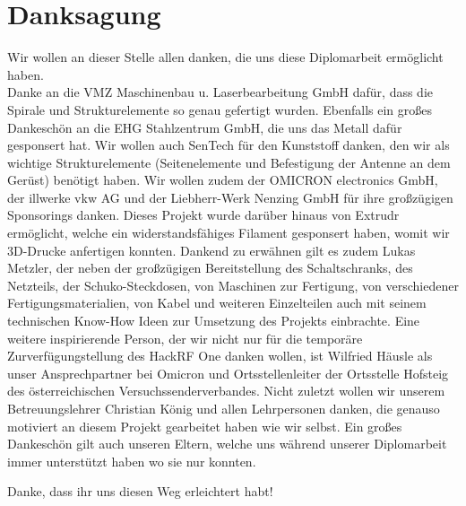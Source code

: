\chapter*{Danksagung}
\label{chap:Danksagung}
Wir wollen an dieser Stelle allen danken, die uns diese Diplomarbeit ermöglicht haben.\\ Danke an die VMZ Maschinenbau u. Laserbearbeitung GmbH dafür, dass die Spirale und Strukturelemente so genau gefertigt wurden. Ebenfalls ein großes Dankeschön an die EHG Stahlzentrum GmbH, die uns das Metall dafür gesponsert hat. Wir wollen auch SenTech für den Kunststoff danken, den wir als wichtige Strukturelemente (Seitenelemente und Befestigung der Antenne an dem Gerüst) benötigt haben. Wir wollen zudem der OMICRON electronics GmbH, der illwerke vkw AG und der Liebherr-Werk Nenzing GmbH für ihre großzügigen Sponsorings danken. Dieses Projekt wurde darüber hinaus von Extrudr ermöglicht, welche ein widerstandsfähiges Filament gesponsert haben, womit wir 3D-Drucke anfertigen konnten. Dankend zu erwähnen gilt es zudem Lukas Metzler, der neben der großzügigen Bereitstellung des Schaltschranks, des Netzteils, der Schuko-Steckdosen, von Maschinen zur Fertigung, von verschiedener Fertigungsmaterialien, von Kabel und weiteren Einzelteilen auch mit seinem technischen Know-How Ideen zur Umsetzung des Projekts einbrachte. Eine weitere inspirierende Person, der wir nicht nur für die temporäre Zurverfügungstellung des HackRF One danken wollen, ist Wilfried Häusle als unser Ansprechpartner bei Omicron und Ortsstellenleiter der Ortsstelle Hofsteig des österreichischen Versuchssenderverbandes. Nicht zuletzt wollen wir unserem Betreuungslehrer Christian König und allen Lehrpersonen danken, die genauso motiviert an diesem Projekt gearbeitet haben wie wir selbst.
Ein großes Dankeschön gilt auch unseren Eltern, welche uns während unserer Diplomarbeit immer unterstützt haben wo sie nur konnten.

Danke, dass ihr uns diesen Weg erleichtert habt!
